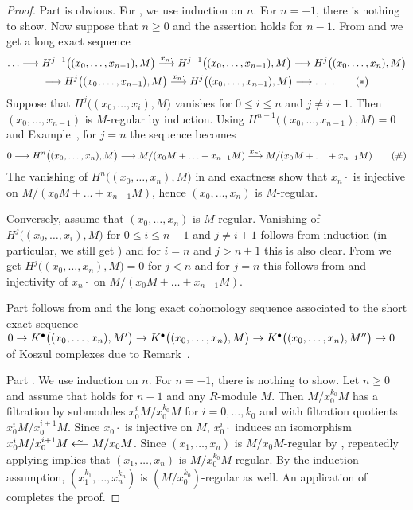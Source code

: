 \documentclass[a4paper,parskip=half,numbers=enddot, DIV=12]{scrreprt}
\begin{document}
\begin{proof}
	Part  is obvious. For , we use induction on $n$. For $n=-1$, there is nothing to show. Now suppose that $n\geq 0$ and the assertion holds for $n-1$. From  and  we get a long exact sequence
	\begin{multline}\lbl{eq:KoszulSeq}
		\ldots\morphism H^{j-1}\big((x_0,\ldots,x_{n-1}),M\big)\morphism[x_n\cdot ] H^{j-1}\big((x_0,\ldots,x_{n-1}),M\big)\morphism H^j\big((x_0,\ldots,x_n),M\big)\\
		\morphism H^j\big((x_0,\ldots,x_{n-1}),M\big)\morphism[x_n\cdot] H^j\big((x_0,\ldots,x_{n-1}),M\big)\morphism\ldots\;.\tag{$*$}
	\end{multline}
	Suppose that $H^j\big((x_0,\ldots,x_i),M\big)$ vanishes for $0\leq i\leq n$ and $j\neq i+1$. Then $(x_0,\ldots,x_{n-1})$ is $M$-regular by induction. Using $H^{n-1}\big((x_0,\ldots,x_{n-1}),M\big)=0$ and Example~, for $j=n$ the sequence  becomes
	\begin{align}\lbl{eq:KoszulSeq2}
		0\morphism H^n\big((x_0,\ldots,x_n),M\big)\morphism M/(x_0M+\ldots+x_{n-1}M)\morphism[ x_n\cdot]M/(x_0M+\ldots+x_{n-1}M)\tag{\#}
	\end{align}
	The vanishing of $H^n\big((x_0,\ldots,x_n),M\big)$ in  and exactness show that $x_n\cdot$ is injective on $M/(x_0M+\ldots+x_{n-1}M)$, hence $(x_0,\ldots,x_n)$ is $M$-regular.
	
	Conversely, assume that $(x_0,\ldots,x_n)$ is $M$-regular. Vanishing of $H^j\big((x_0,\ldots,x_i),M\big)$ for $0\leq i\leq n-1$ and $j\neq i+1$ follows from induction (in particular, we still get ) and for $i=n$ and $j>n+1$ this is also clear. From  we get $H^j\big((x_0,\ldots,x_n),M\big)=0$ for $j<n$ and for $j=n$ this follows from  and injectivity of $x_n\cdot$ on $M/(x_0M+\ldots+x_{n-1}M)$.
	
	
	Part  follows from  and the long exact cohomology sequence associated to the short exact sequence $0\morphism K^\bullet\big((x_0,\ldots,x_n),M'\big)\morphism K^\bullet\big((x_0,\ldots,x_n),M\big)\morphism K^\bullet\big((x_0,\ldots,x_n),M''\big)\morphism 0$ of Koszul complexes due to Remark~.
	
	Part . We use induction on $n$. For $n=-1$, there is nothing to show. Let $n\geq 0$ and assume that  holds for $n-1$ and any $R$-module $M$. Then $M/x_0^{k_0}M$ has a filtration by submodules $x_0^iM/x_0^{k_0}M$ for $i=0,\ldots,k_0$ and with filtration quotients $x_0^iM/x_0^{i+1}M$. Since $x_0\cdot$ is injective on $M$, $x_0^i\cdot$ induces an isomorphism $x_0^iM/x_0^{i+1}M\lisomorphism M/x_0M$. Since $(x_1,\ldots,x_n)$ is $M/x_0M$-regular by , repeatedly applying  implies that $(x_1,\ldots,x_n)$ is $M/x_0^{k_0}M$-regular. By the induction assumption, $(x_1^{k_1},\ldots,x_n^{k_n})$ is $(M/x_0^{k_0})$-regular as well. An application of  completes the proof.
\end{proof}
\end{document}
